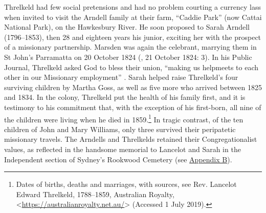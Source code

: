 Threlkeld had few social pretensions and had no problem courting a currency lass when invited to visit the Arndell family at their farm, “Caddie Park” (now Cattai National Park), on the Hawkesbury River. He soon proposed to Sarah Arndell (1796--1853), then 28 and eighteen years his junior, exciting her with the prospect of a missionary partnership. Marsden was again the celebrant, marrying them in St John’s Parramatta on 20 October 1824 (\textit{}, 21 October 1824: 3). In his Public Journal, Threlkeld asked God to bless their union, “making us helpmeets to each other in our Missionary employment” \citep[21]{gunson_australian_1974a}. Sarah helped raise Threlkeld’s four surviving children by Martha Goss, as well as five more who arrived between 1825 and 1834. In the colony, Threlkeld put the health of his family first, and it is testimony to his commitment that, with the exception of his first-born, all nine of the children were living when he died in 1859.\footnote{Dates of births, deaths and marriages, with sources, see Rev. Lancelot Edward Threlkeld, 1788--1859, Australian Royalty, <\url{https://australianroyalty.net.au/}> (Accessed 1 July 2019).} In tragic contrast, of the ten children of John and Mary Williams, only three survived their peripatetic missionary travels. The Arndells and Threlkelds retained their Congregationalist values, as reflected in the handsome memorial to Lancelot and Sarah in the Independent section of Sydney’s Rookwood Cemetery (see \hyperref[Appendix_B]{Appendix B}).

